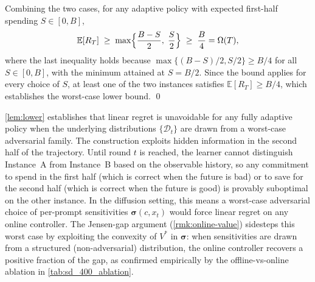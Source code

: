 Combining the two cases, for any adaptive policy with expected first-half spending $S \in [0, B]$,
\[
  \mathbb{E}[R_T] \;\ge\; \max\Bigl\{\frac{B - S}{2},\;\frac{S}{2}\Bigr\} \;\ge\; \frac{B}{4} = \Omega(T),
\]
where the last inequality holds because $\max\{(B-S)/2, S/2\} \ge B/4$ for all $S \in [0, B]$, with the minimum attained at $S = B/2$. Since the bound applies for every choice of $S$, at least one of the two instances satisfies $\mathbb{E}[R_T] \ge B/4$, which establishes the worst-case lower bound. \qed
%
\begin{remark}
\cref{lem:lower} establishes that linear regret is unavoidable for any fully adaptive policy when the underlying distributions $\{\mathcal{D}_t\}$ are drawn from a worst-case adversarial family. The construction exploits hidden information in the second half of the trajectory. Until round $t$ is reached, the learner cannot distinguish Instance~A from Instance~B based on the observable history, so any commitment to spend in the first half (which is correct when the future is bad) or to save for the second half (which is correct when the future is good) is provably suboptimal on the other instance. In the diffusion setting, this means a worst-case adversarial choice of per-prompt sensitivities $\boldsymbol{\sigma}(c, x_t)$ would force linear regret on any online controller. The Jensen-gap argument (\cref{rmk:online-value}) sidesteps this worst case by exploiting the convexity of $V^*$ in $\boldsymbol{\sigma}$: when sensitivities are drawn from a structured (non-adversarial) distribution, the online controller recovers a positive fraction of the gap, as confirmed empirically by the offline-vs-online ablation in \cref{tab:sd_400_ablation}.
\end{remark}
